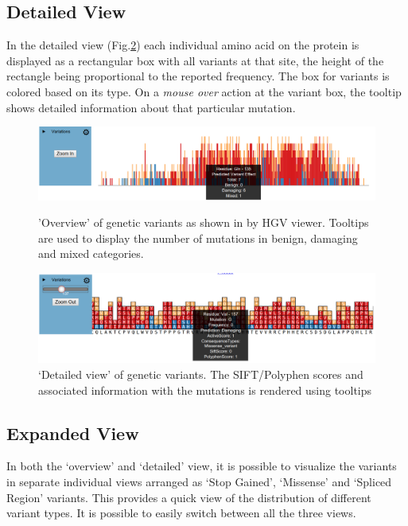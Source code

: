 \documentclass{bioinfo}
\begin{document}
\subsection{Detailed View}
In the detailed view (Fig.\ref{zoomedtooltip}) each individual amino acid on the protein is displayed as a rectangular box with all variants at that site, the height of the rectangle being proportional to the reported frequency. The box for variants is colored based on its type. On a \textit{mouse over} action at the variant box, the tooltip shows detailed information about that particular mutation.
\begin{figure}
\includegraphics[width=\linewidth]{images/overview_withtooltip}
\label{overviewtooltip}
\caption{'Overview' of genetic variants as shown in by HGV viewer. Tooltips are used to display the number of mutations in benign, damaging and mixed categories.}
\end{figure}


\begin{figure}
\includegraphics[width=\linewidth]{images/zoomed_withtooltip}
\caption{`Detailed view' of genetic variants. The SIFT/Polyphen scores and associated information with the mutations is rendered using tooltips}
\label{zoomedtooltip}
\end{figure}

\subsection{Expanded View}

In both the `overview' and `detailed' view, it is possible
to visualize the variants in separate individual views arranged as `Stop Gained', `Missense' and `Spliced Region' variants. This provides a quick view of the distribution of different variant types. It is possible to easily switch between all the three views.
\end{document}
